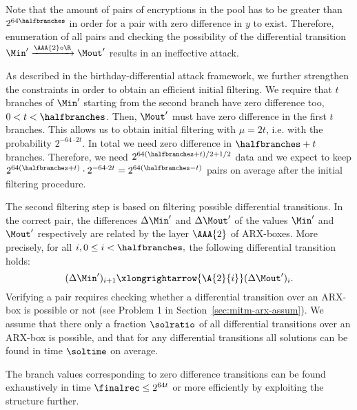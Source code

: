 Note that the amount of pairs of encryptions in the pool has to be greater than $2^{64\halfbranches}$ in order for a pair with zero difference in $y$ to exist. Therefore, enumeration of all pairs and checking the possibility of the differential transition $\Min' \xrightarrow{\AAA{2} \circ \R} \Mout'$ results in an ineffective attack.

As described in the birthday-differential attack framework, we further strengthen the constraints in order to obtain an efficient initial filtering. We require that $t$ branches of $\Min'$ starting from the second branch have zero difference too, $0 < t < \halfbranches$. Then, $\Mout'$ must have zero difference in the first $t$ branches. This allows us to obtain initial filtering with $\mu=2t$, i.e. with the probability $2^{-64\cdot 2t}$. In total we need zero difference in $\halfbranches+t$ branches. Therefore, we need $2^{64(\halfbranches+t)/2+1/2}$ data and we expect to keep $2^{64(\halfbranches+t)}\cdot2^{-64\cdot2t}=2^{64(\halfbranches-t)}$ pairs on average after the initial filtering procedure.

The second filtering step is based on filtering possible differential transitions. In the correct pair, the differences $\Delta\Min'$ and $\Delta\Mout'$ of the values $\Min'$ and $\Mout'$ respectively are related by the layer $\AAA{2}$ of ARX-boxes. More precisely, for all $i, 0\le i < \halfbranches,$ the following differential transition holds:
$$
(\Delta\Min')_{i+1} \xlongrightarrow{\A{2}{i}} (\Delta\Mout')_i.
$$
Verifying a pair requires checking whether a differential transition over an ARX-box is possible or not (see Problem 1 in Section~\ref{sec:mitm-arx-assum}). We assume that there only a fraction $\solratio$ of all differential transitions over an ARX-box is possible, and that for any differential transitions all solutions can be found in time $\soltime$ on average.

The branch values corresponding to zero difference transitions can be found exhaustively in time $\finalrec \le 2^{64t}$ or more efficiently by exploiting the structure further.

